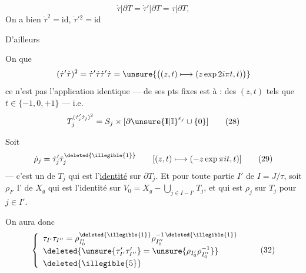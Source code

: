 
\[
\dot\tau|\partial T=\dot\tau'|\partial T=\tau|\partial T,
\]
On a bien $\dot\tau^2=\mathrm{id}$, $\dot\tau'{}^2=\mathrm{id}$

D'ailleurs


On  que
\[
(\dot\tau'\dot\tau)^2
=\dot\tau'\dot\tau\dot\tau'\dot\tau
=\unsure{\bigl((z,t)\longmapsto(z\exp 2i\pi t,t)\bigr)}
\]
ce n'est pas l'application identique ---  de ses pts fixes est  à : 
 des $(z,t)$ tels que $t\in\{-1,0,+1\}$ --- i.e.
\[
T_j^{(\dot\tau'_j\dot\tau_j)^2}
=S_j\times[\partial\unsure{\mathbf I|\mathbb I}^{\varepsilon_j}\cup\{0\}]
\tag{28}
\]



Soit 
\[
\dot\rho_j=\dot\tau'_j\dot\tau_j^{\deleted{\illegible{1}}}
\qquad [(z,t)\longmapsto(-z\exp\pi it,t)]
\tag{29}
\]
--- c'est un  de $T_j$ qui est l'\uline{identité} sur $\partial T_j$.
Et pour toute partie $I'$ de $I=J/\tau$, soit $\rho_{I'}$ l' de $X_g$ qui est l'identité sur
$V_0=X_g-\bigcup_{j\in I-I'}T_j$,
et qui est $\rho_j$ sur $T_j$ pour $j\in I'$.



On aura donc
\[
\left\{
\begin{array}{l}
\tau_{I'}\tau_{I''}
=\rho_{I'_0}^{\deleted{\illegible{1}}}\rho_{I''_0}^{-1\,\deleted{\illegible{1}}}
\\[3pt]
\deleted{\unsure{\tau'_{I'}\tau'_{I''}}=\unsure{\rho_{I'_0}\rho_{I''_0}^{-1}}}
\\[3pt]
\deleted{\illegible{5}}
\end{array}
\right.
\tag{32}
\]

